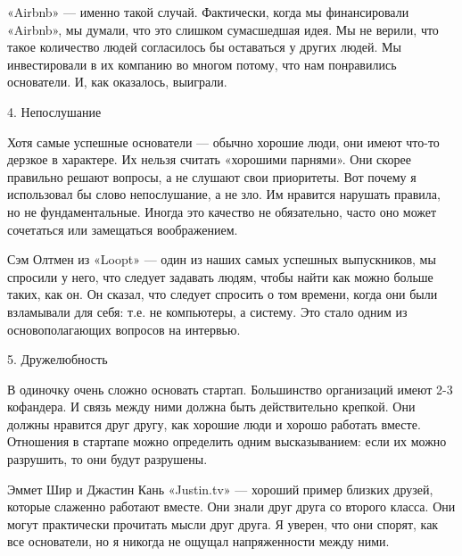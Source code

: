\documentclass[ebook,12pt,oneside,openany]{memoir}
\begin{document}
«Airbnb» — именно такой случай. Фактически, когда мы финансировали
«Airbnb», мы думали, что это слишком сумасшедшая идея. Мы не верили,
что такое количество людей согласилось бы оставаться у других людей.
Мы инвестировали в их компанию во многом потому, что нам понравились
основатели. И, как оказалось, выиграли.

4. Непослушание

Хотя самые успешные основатели — обычно хорошие люди, они имеют что-то
дерзкое в характере. Их нельзя считать «хорошими парнями». Они скорее
правильно решают вопросы, а не слушают свои приоритеты. Вот почему я
использовал бы слово непослушание, а не зло. Им нравится нарушать
правила, но не фундаментальные. Иногда это качество не обязательно,
часто оно может сочетаться или замещаться воображением.

Сэм Олтмен из «Loopt» — один из наших самых успешных выпускников, мы
спросили у него, что следует задавать людям, чтобы найти как можно
больше таких, как он. Он сказал, что следует спросить о том времени,
когда они были взламывали для себя: т.е. не компьютеры, а систему. Это
стало одним из основополагающих вопросов на интервью.

5. Дружелюбность

В одиночку очень сложно основать стартап. Большинство организаций
имеют 2-3 кофандера. И связь между ними должна быть действительно
крепкой. Они должны нравится друг другу, как хорошие люди и хорошо
работать вместе. Отношения в стартапе можно определить одним
высказыванием: если их можно разрушить, то они будут разрушены.

Эммет Шир и Джастин Кань «Justin.tv» — хороший пример близких друзей,
которые слаженно работают вместе. Они знали друг друга со второго
класса. Они могут практически прочитать мысли друг друга. Я уверен,
что они спорят, как все основатели, но я никогда не ощущал
напряженности между ними.
\end{document}
